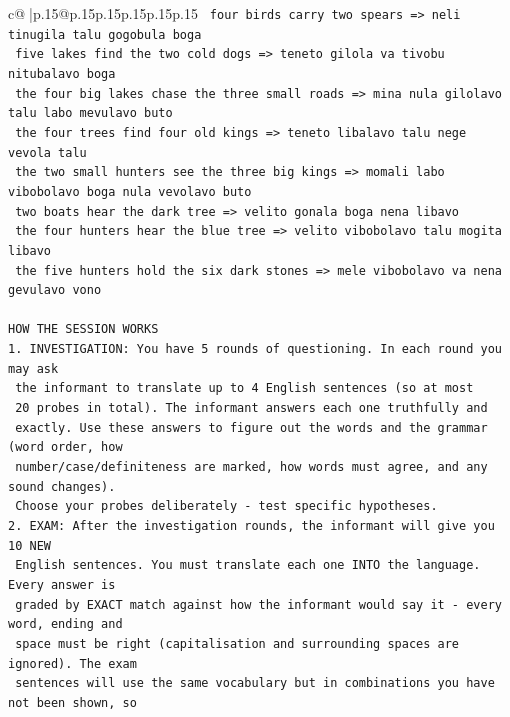 \documentclass{article}
\begin{document}
{\begin{supertabular}{c@{$\;$}|p{.15\linewidth}@{}p{.15\linewidth}p{.15\linewidth}p{.15\linewidth}p{.15\linewidth}p{.15\linewidth}}
{{{\texttt{    four birds carry two spears  =>  neli tinugila talu gogobula boga} \\
\texttt{    five lakes find the two cold dogs  =>  teneto gilola va tivobu nitubalavo boga} \\
\texttt{    the four big lakes chase the three small roads  =>  mina nula gilolavo talu labo mevulavo buto} \\
\texttt{    the four trees find four old kings  =>  teneto libalavo talu nege vevola talu} \\
\texttt{    the two small hunters see the three big kings  =>  momali labo vibobolavo boga nula vevolavo buto} \\
\texttt{    two boats hear the dark tree  =>  velito gonala boga nena libavo} \\
\texttt{    the four hunters hear the blue tree  =>  velito vibobolavo talu mogita libavo} \\
\texttt{    the five hunters hold the six dark stones  =>  mele vibobolavo va nena gevulavo vono} \\
\\ 
\texttt{HOW THE SESSION WORKS} \\
\texttt{1. INVESTIGATION: You have 5 rounds of questioning. In each round you may ask} \\
\texttt{   the informant to translate up to 4 English sentences (so at most} \\
\texttt{   20 probes in total). The informant answers each one truthfully and} \\
\texttt{   exactly. Use these answers to figure out the words and the grammar (word order, how} \\
\texttt{   number/case/definiteness are marked, how words must agree, and any sound changes).} \\
\texttt{   Choose your probes deliberately {-} test specific hypotheses.} \\
\texttt{2. EXAM: After the investigation rounds, the informant will give you 10 NEW} \\
\texttt{   English sentences. You must translate each one INTO the language. Every answer is} \\
\texttt{   graded by EXACT match against how the informant would say it {-} every word, ending and} \\
\texttt{   space must be right (capitalisation and surrounding spaces are ignored). The exam} \\
\texttt{   sentences will use the same vocabulary but in combinations you have not been shown, so} \\
}}}
\end{supertabular}}
\end{document}
